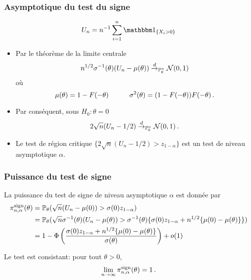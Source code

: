 \begin{frame}
\frametitle{Asymptotique du test du signe}
$$
U_n= n^{-1} \sum_{i=1}^n \indi{X_i > 0}
$$
\begin{itemize}
\item Par le théorème de la limite centrale
$$
n^{1/2} \sigma^{-1}(\theta) (U_n - \mu(\theta)) \stackrel{d}{\rightarrow}_{\operatorname{{\mathbb P}}^n_\theta} \mathcal{N}(0,1)
$$
où
\[
\mu(\theta) = 1 - F(-\theta) \quad \qquad \sigma^2(\theta) = (1-F(-\theta)) F(-\theta) \,.
\]
\item Par conséquent, sous $H_0: \theta = 0$
\[
2 \sqrt{n} (U_n - 1/2) \stackrel{d}{\rightarrow}_{\operatorname{{\mathbb P}}^n_0} \mathcal{N}(0,1) \,.
\]
\item Le test de région critique  $\{ 2 \sqrt{n} (U_n -1/2) > z_{ 1-\alpha} \}$ est un test de niveau asymptotique $\alpha$.
\end{itemize}
\end{frame}

\begin{frame}
\frametitle{Puissance du test de signe}
La puissance du test de signe de niveau asymptotique $\alpha$ est donnée par
\begin{align*}
\pi^{\mathrm{sign}}_{n,\alpha}(\theta)
&= \operatorname{{\mathbb P}}_\theta( \sqrt{n}(U_n - \mu(0)) > \sigma(0) z_{1-\alpha}) \\
&= \operatorname{{\mathbb P}}_\theta( \sqrt{n} \sigma^{-1}(\theta) (U_n - \mu(\theta)) > \sigma^{-1}(\theta) \{ \sigma(0) z_{1-\alpha} + n^{1/2} \{\mu(0)-\mu(\theta)\}\}) \\
&= 1 - \Phi\left( \frac{\sigma(0) z_{1-\alpha} + n^{1/2} \{ \mu(0) - \mu(\theta)\}}{\sigma(\theta)} \right) + o(1)
\end{align*}

Le test est \alert{consistant}: pour tout $\theta > 0$,
\alert{
\[
\lim_{n \to \infty}  \pi^{\mathrm{sign}}_{n,\alpha}(\theta) = 1 \,.
\]
}
\end{frame}



